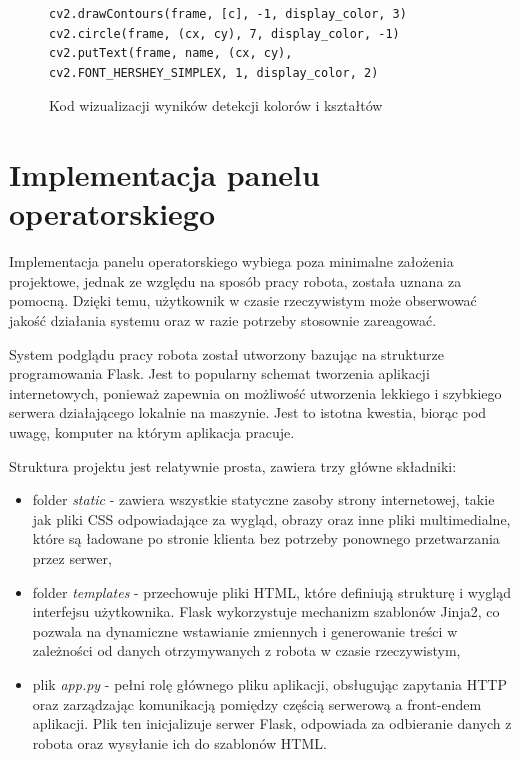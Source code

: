 \begin{figure}[h!]
  \centering
  \begin{lstlisting}
cv2.drawContours(frame, [c], -1, display_color, 3)
cv2.circle(frame, (cx, cy), 7, display_color, -1)
cv2.putText(frame, name, (cx, cy), cv2.FONT_HERSHEY_SIMPLEX, 1, display_color, 2)
  \end{lstlisting}
  \caption{Kod wizualizacji wyników detekcji kolorów i kształtów}
  \label{fig:visualization}
\end{figure}

\section{Implementacja panelu operatorskiego}

Implementacja panelu operatorskiego wybiega poza minimalne założenia projektowe, jednak ze względu na sposób pracy robota, została uznana za pomocną. Dzięki temu, użytkownik w czasie rzeczywistym może obserwować jakość działania systemu oraz w razie potrzeby stosownie zareagować. 

System podglądu pracy robota został utworzony bazując na strukturze programowania Flask. Jest to popularny schemat tworzenia aplikacji internetowych, ponieważ zapewnia on możliwość utworzenia lekkiego i szybkiego serwera działającego lokalnie na maszynie. Jest to istotna kwestia, biorąc pod uwagę, komputer na którym aplikacja pracuje. 

Struktura projektu jest relatywnie prosta, zawiera trzy główne składniki:
\begin{itemize}
  \item folder \textit{static} - zawiera wszystkie statyczne zasoby strony internetowej, takie jak pliki CSS odpowiadające za wygląd, obrazy oraz inne pliki multimedialne, które są ładowane po stronie klienta bez potrzeby ponownego przetwarzania przez serwer,
  \item folder \textit{templates} - przechowuje pliki HTML, które definiują strukturę i wygląd interfejsu użytkownika. Flask wykorzystuje mechanizm szablonów Jinja2, co pozwala na dynamiczne wstawianie zmiennych i generowanie treści w zależności od danych otrzymywanych z robota w czasie rzeczywistym,
  \item plik \textit{app.py} -  pełni rolę głównego pliku aplikacji, obsługując zapytania HTTP oraz zarządzając komunikacją pomiędzy częścią serwerową a front-endem aplikacji. Plik ten inicjalizuje serwer Flask, odpowiada za odbieranie danych z robota oraz wysyłanie ich do szablonów HTML.
\end{itemize} 
